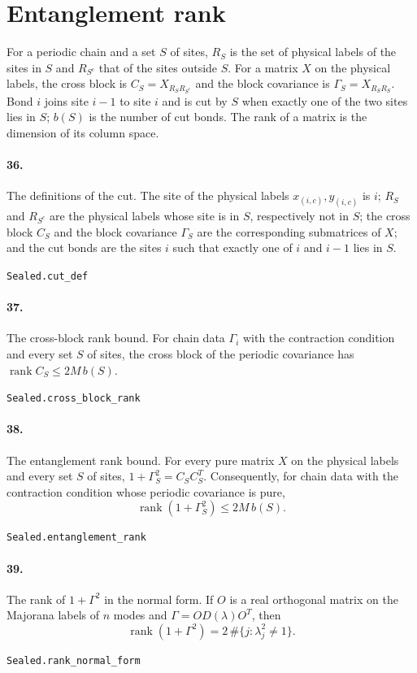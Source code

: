 \documentclass[11pt]{article}
\begin{document}
\section*{Entanglement rank}
For a periodic chain and a set $S$ of sites, $R_S$ is the set of physical labels of the sites in $S$ and $R_{S^c}$ that of the sites outside $S$. For a matrix $X$ on the physical labels, the cross block is $C_S = X_{R_S R_{S^c}}$ and the block covariance is $\Gamma_S = X_{R_S R_S}$. Bond $i$ joins site $i - 1$ to site $i$ and is cut by $S$ when exactly one of the two sites lies in $S$; $b(S)$ is the number of cut bonds. The rank of a matrix is the dimension of its column space.

\paragraph{36.} The definitions of the cut. The site of the physical labels $x_{(i,c)}, y_{(i,c)}$ is $i$; $R_S$ and $R_{S^c}$ are the physical labels whose site is in $S$, respectively not in $S$; the cross block $C_S$ and the block covariance $\Gamma_S$ are the corresponding submatrices of $X$; and the cut bonds are the sites $i$ such that exactly one of $i$ and $i - 1$ lies in $S$.\par{\footnotesize\texttt{Sealed.cut\_def}}

\paragraph{37.} The cross-block rank bound. For chain data $\Gamma_i$ with the contraction condition and every set $S$ of sites, the cross block of the periodic covariance has $\operatorname{rank} C_S \le 2 M\, b(S)$.\par{\footnotesize\texttt{Sealed.cross\_block\_rank}}

\paragraph{38.} The entanglement rank bound. For every pure matrix $X$ on the physical labels and every set $S$ of sites, $1 + \Gamma_S^2 = C_S C_S^T$. Consequently, for chain data with the contraction condition whose periodic covariance is pure, \[\operatorname{rank}(1 + \Gamma_S^2) \le 2 M\, b(S).\]\par{\footnotesize\texttt{Sealed.entanglement\_rank}}

\paragraph{39.} The rank of $1 + \Gamma^2$ in the normal form. If $O$ is a real orthogonal matrix on the Majorana labels of $n$ modes and $\Gamma = O D(\lambda) O^T$, then \[\operatorname{rank}(1 + \Gamma^2) = 2\, \#\{j : \lambda_j^2 \ne 1\}.\]\par{\footnotesize\texttt{Sealed.rank\_normal\_form}}
\end{document}
